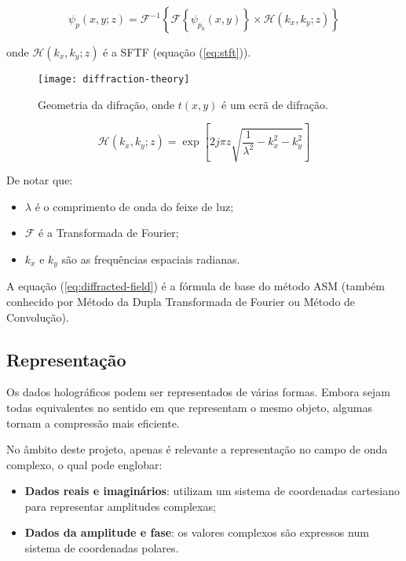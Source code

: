 \begin{equation}
  \psi_p(x,y;z) = \mathcal{F}^{-1}\left\{\mathcal{F}\left\{\psi_{p_0}(x,y)\right\}\times\mathcal{H}(k_x,k_y;z)\right\}
  \label{eq:diffracted-field}
\end{equation}

onde $\mathcal{H}(k_x,k_y;z)$ é a \ac{SFTF} (equação (\ref{eq:stft})).

\begin{figure}[!bp]
  \centering
  \texttt{[image: diffraction-theory]}
  \caption[Geometria da difração.]{Geometria da difração, onde $t(x,y)$ é um ecrã de difração\cite{Poon2014}.}
  \label{fig:diffraction-theory}
\end{figure}

\begin{equation}
  \mathcal{H}(k_x,k_y;z) = \exp\left[2j\pi z\sqrt{\frac{1}{\lambda^2}-k_x^2-k_y^2}\right]
  \label{eq:stft}
\end{equation}

De notar que:
\begin{itemize}
  \item $\lambda$ é o comprimento de onda do feixe de luz;
  \item $\mathcal{F}$ é a Transformada de Fourier;
  \item $k_x$ e $k_y$ são as frequências espaciais radianas.
\end{itemize}

A equação (\ref{eq:diffracted-field}) é a fórmula de base do método \ac{ASM} (também conhecido por Método da Dupla Transformada de Fourier ou Método de Convolução)\cite{Poon2014}.


\subsection{Representação}
\label{ssec::estado-arte:holograma:rep}

Os dados holográficos podem ser representados de várias formas. Embora sejam todas equivalentes no sentido em que representam o mesmo objeto, algumas tornam a compressão mais eficiente. 

No âmbito deste projeto, apenas é relevante a representação no campo de onda complexo, o qual pode englobar\cite{Image2018}:

\begin{itemize}
    \item \textbf{Dados reais e imaginários}: utilizam um sistema de coordenadas cartesiano para representar amplitudes complexas;
    \item \textbf{Dados da amplitude e fase}: os valores complexos são expressos num sistema de coordenadas polares.
\end{itemize}

